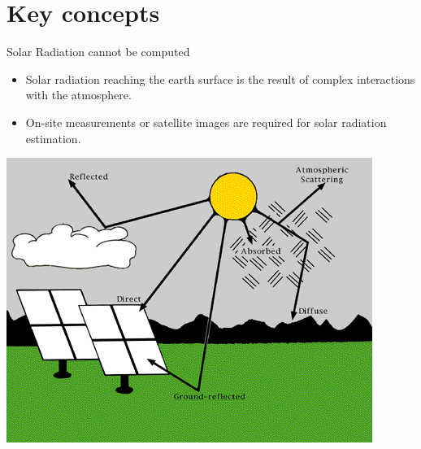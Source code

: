 \documentclass[xcolor={usenames,svgnames,dvipsnames}]{beamer}
\begin{document}
\section{Key concepts}
\label{sec:orgf7faae9}
\begin{frame}[label={sec:org255c1f3}]{Solar Radiation cannot be computed}
\begin{itemize}
\item Solar radiation reaching the earth surface is the result of \alert{complex interactions with the atmosphere}.
\item On-site measurements or satellite images are required for solar radiation estimation.
\end{itemize}
\begin{center}
\includegraphics[height=0.5\textheight]{../figs/SolarRadiationComponents_NREL.png}
\end{center}
\end{frame}
\end{document}
